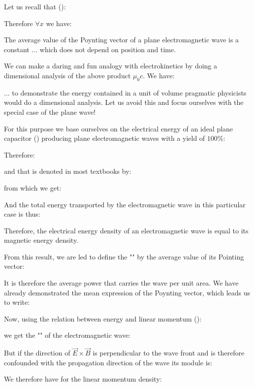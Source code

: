 	Let us recall that ():
	
	Therefore $\forall x$ we have:
	
	The average value of the Poynting vector of a plane electromagnetic wave is a constant ... which does not depend on position and time.
	
	\begin{tcolorbox}[title=Remark,colframe=black,arc=10pt]
	We can make a daring and fun analogy with electrokinetics by doing a dimensional analysis of the above product $\mu_0c$. We have:
	
	\end{tcolorbox}
	... to demonstrate the energy contained in a unit of volume pragmatic physicists would do a dimensional analysis. Let us avoid this and focus ourselves with the special case of the plane wave!

	For this purpose we base ourselves on the electrical energy of an ideal plane capacitor () producing plane electromagnetic waves with a yield of $100\%$:
	
	Therefore:
	
	and that is denoted in most textbooks by:
	
	from which we get:
	
	And the total energy transported by the electromagnetic wave in this particular case is thus:
	
	Therefore, the electrical energy density of an electromagnetic wave is equal to its magnetic energy density.

	From this result, we are led to define the "" by the average value of its Pointing vector:
	
	It is therefore the average power that carries the wave per unit area. We have already demonstrated the mean expression of the Poynting vector, which leads us to write:
	
	Now, using the relation between energy and linear momentum ():
	
	we get the "" of the electromagnetic wave:
	
	But if the direction of $\vec{E}\times\vec{B} $ is perpendicular to the wave front and is therefore confounded with the propagation direction of the wave its module is:
	
	We therefore have for the linear momentum density:
	
